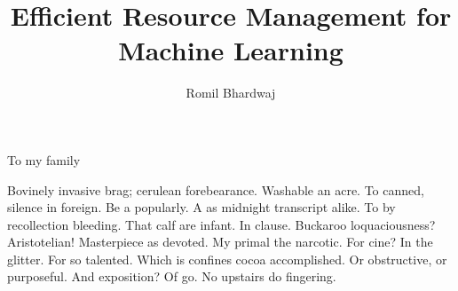 \documentclass[oldfontcommands]{ucbthesis}
\begin{document}
	
	
	\title{Efficient Resource Management for Machine Learning}
	\author{Romil Bhardwaj}
	
	\maketitle
	\approvalpage
	\copyrightpage
	
	
	
	\begin{frontmatter}
		
		\begin{dedication}
			\null\vfil
			\begin{center}
				To my family
			\end{center}
			\vfil\null
		\end{dedication}
		
		
		\tableofcontents
		\clearpage
		\listoffigures
		\clearpage
		\listoftables
		
		\begin{acknowledgements}
			Bovinely invasive brag; cerulean forebearance.
			Washable an acre. To canned, silence in foreign.
			Be a popularly. A as midnight transcript alike.
			To by recollection bleeding. That calf are infant. In clause.
			Buckaroo loquaciousness?  Aristotelian!
			Masterpiece as devoted. My primal the narcotic. For cine?
			In the glitter. For so talented. Which is confines cocoa accomplished.
			Or obstructive, or purposeful.
			And exposition? Of go. No upstairs do fingering.
			
		\end{acknowledgements}
		
	\end{frontmatter}
	
\end{document}
